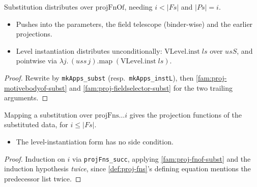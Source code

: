 \begin{lemma}
  \label{fam:proj-fnof-subst}
  \leanok

   Substitution distributes over $\mathrm{projFnOf}$, needing $i<|Fs|$ and $|Ps|=i$.
  \begin{itemize}
  \item Pushes into the parameters, the field telescope (binder-wise) and the earlier projections.
  \item Level instantiation distributes unconditionally: $\mathrm{VLevel.inst}\;ls$ over $usS$, and
        pointwise via $\lambda j.\,(uss\,j).\mathrm{map}\;(\mathrm{VLevel.inst}\;ls)$.
  \end{itemize}
\end{lemma}
\begin{proof}
  \leanok
   Rewrite by \texttt{mkApps\_subst} (resp.\ \texttt{mkApps\_instL}), then
  \ref{fam:proj-motivebodyof-subst} and \ref{fam:proj-fieldselector-subst} for the two trailing
  arguments.
\end{proof}

\begin{lemma}
  \label{fam:proj-fns-subst}
  \leanok

   Mapping a substitution over $\mathrm{projFns}\dots i$ gives the projection
  functions of the substituted data, for $i\le|Fs|$.
  \begin{itemize}
  \item The level-instantiation form has no side condition.
  \end{itemize}
\end{lemma}
\begin{proof}
  \leanok
   Induction on $i$ via \texttt{projFns\_succ}, applying \ref{fam:proj-fnof-subst} and
  the induction hypothesis \emph{twice}, since \ref{def:proj-fns}'s defining equation mentions the
  predecessor list twice.
\end{proof}

